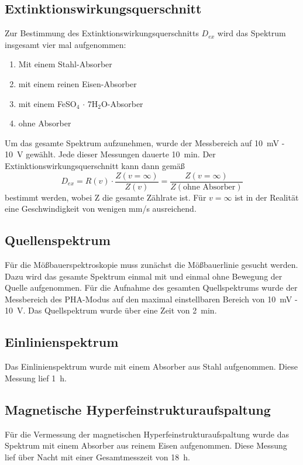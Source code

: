 \documentclass[12pt,a4paper]{article}
\begin{document}
\subsection{Extinktionswirkungsquerschnitt}
Zur Bestimmung des Extinktionswirkungsquerschnitts $D_{ex}$ wird das Spektrum insgesamt vier mal aufgenommen:
\begin{enumerate}
\item Mit einem Stahl-Absorber
\item mit einem reinen Eisen-Absorber
\item mit einem FeSO$_4$ $\cdot$ 7H$_2$O-Absorber
\item ohne Absorber 
\end{enumerate} 
Um das gesamte Spektrum aufzunehmen, wurde der Messbereich auf \SI{10}{mV} - \SI{10}{V} gewählt. Jede dieser Messungen dauerte \SI{10}{min}. Der Extinktionswirkungsquerschnitt kann dann gemäß
\begin{equation}
D_{ex} = R(v) \cdot \dfrac{Z(v = \infty)}{Z(v)} = \dfrac{Z(v = \infty)}{Z(\textrm{ohne Absorber})}
\end{equation}
bestimmt werden, wobei Z die gesamte Zählrate ist. Für $v = \infty$ ist in der Realität eine Geschwindigkeit von wenigen mm/s ausreichend.

\subsection{Quellenspektrum}
Für die Mößbauerspektroskopie muss zunächst die Mößbauerlinie gesucht werden. Dazu wird das gesamte Spektrum einmal mit und einmal ohne Bewegung der Quelle aufgenommen. Für die Aufnahme des gesamten Quellspektrums wurde der Messbereich des PHA-Modus auf den maximal einstellbaren Bereich von \SI{10}{mV} - \SI{10}{V}. Das Quellspektrum wurde über eine Zeit von \SI{2}{min}.

\subsection{Einlinienspektrum}
Das Einlinienspektrum wurde mit einem Absorber aus Stahl aufgenommen. Diese Messung lief \SI{1}{h}.

\subsection{Magnetische Hyperfeinstrukturaufspaltung}
Für die Vermessung der magnetischen Hyperfeinstrukturaufspaltung wurde das Spektrum mit einem Absorber aus reinem Eisen aufgenommen. Diese Messung lief über Nacht mit einer Gesamtmesszeit von \SI{18}{h}.
\end{document}
